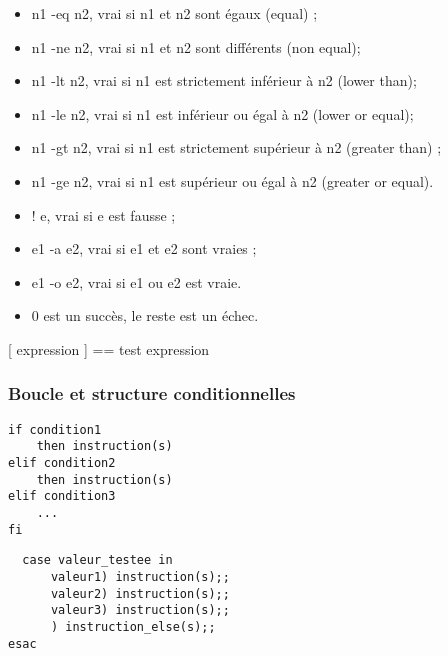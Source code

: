 \documentclass[11pt]{article}
\begin{document}
\begin{itemize}
\item n1 -eq n2, vrai si n1 et n2 sont égaux (equal) ;
\item n1 -ne n2, vrai si n1 et n2 sont différents (non equal);
\item n1 -lt n2, vrai si n1 est strictement inférieur à n2 (lower than);
\item n1 -le n2, vrai si n1 est inférieur ou égal à n2 (lower or equal);
\item n1 -gt n2, vrai si n1 est strictement supérieur à n2 (greater than) ;
\item n1 -ge n2, vrai si n1 est supérieur ou égal à n2 (greater or equal).

\item ! e, vrai si e est fausse ;
\item e1 -a e2, vrai si e1 et e2 sont vraies ;
\item e1 -o e2, vrai si e1 ou e2 est vraie.
\item 0 est un succès, le reste est un échec.
\end{itemize}

[ expression ] == test expression

\subsubsection{Boucle et structure conditionnelles}
\label{sec:orgbb5a0f1}
\begin{lstlisting}
if condition1
    then instruction(s)
elif condition2
    then instruction(s)
elif condition3
    ...
fi
\end{lstlisting}

\begin{lstlisting}
  case valeur_testee in
      valeur1) instruction(s);;
      valeur2) instruction(s);;
      valeur3) instruction(s);;
      ) instruction_else(s);;
esac
\end{lstlisting}
\end{document}
